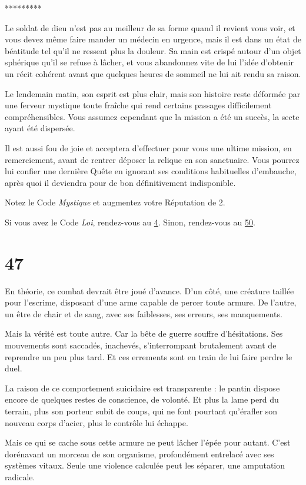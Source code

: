 \documentclass{report}
\newcommand{\gsection}[1]{
    \section{#1}
    \label{section-#1}
}
\newcommand{\glink}[1]{\hyperref[section-#1]{#1}}
\newcommand{\ellipse}{
    \begin{center}
        *********
    \end{center}
}
\begin{document}
\ellipse

Le soldat de dieu n'est pas au meilleur de sa forme quand il revient vous voir, et vous devez même faire mander un médecin en urgence, mais il est dans un état de béatitude tel qu'il ne ressent plus la douleur. Sa main est crispé autour d'un objet sphérique qu'il se refuse à lâcher, et vous abandonnez vite de lui l'idée d'obtenir un récit cohérent avant que quelques heures de sommeil ne lui ait rendu sa raison.

Le lendemain matin, son esprit est plus clair, mais son histoire reste déformée par une ferveur mystique toute fraîche qui rend certains passages difficilement compréhensibles. Vous assumez cependant que la mission a été un succès, la secte ayant été dispersée.

Il est aussi fou de joie et acceptera d'effectuer pour vous une ultime mission, en remerciement, avant de rentrer déposer la relique en son sanctuaire. Vous pourrez lui confier une dernière Quête en ignorant ses conditions habituelles d'embauche, après quoi il deviendra pour de bon définitivement indisponible.

Notez le Code \emph{Mystique} et augmentez votre Réputation de 2.

Si vous avez le Code \emph{Loi}, rendez-vous au \glink{4}. Sinon, rendez-vous au \glink{50}.

\gsection{47}

En théorie, ce combat devrait être joué d'avance. D'un côté, une créature taillée pour l'escrime, disposant d'une arme capable de percer toute armure. De l'autre, un être de chair et de sang, avec ses faiblesses, ses erreurs, ses manquements.

Mais la vérité est toute autre. Car la bête de guerre souffre d'hésitations. Ses mouvements sont saccadés, inachevés, s'interrompant brutalement avant de reprendre un peu plus tard. Et ces errements sont en train de lui faire perdre le duel.

La raison de ce comportement suicidaire est transparente : le pantin dispose encore de quelques restes de conscience, de volonté. Et plus la lame perd du terrain, plus son porteur subit de coups, qui ne font pourtant qu'érafler son nouveau corps d'acier, plus le contrôle lui échappe.

Mais ce qui se cache sous cette armure ne peut lâcher l'épée pour autant. C'est dorénavant un morceau de son organisme, profondément entrelacé avec ses systèmes vitaux. Seule une violence calculée peut les séparer, une amputation radicale.
\end{document}
